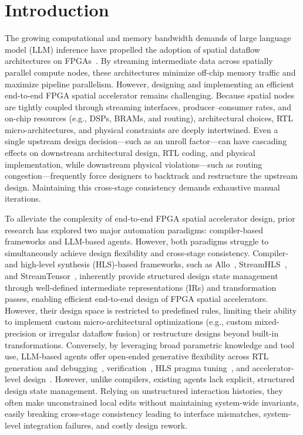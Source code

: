 \documentclass[9pt,conference]{IEEEtran}
\begin{document}
\section{Introduction}
The growing computational and memory bandwidth demands of large language model (LLM) inference have propelled the adoption of spatial dataflow architectures on FPGAs~\cite{streamtensor}. By streaming intermediate data across spatially parallel compute nodes, these architectures minimize off-chip memory traffic and maximize pipeline parallelism. However, designing and implementing an efficient end-to-end FPGA spatial accelerator remains challenging. Because spatial nodes are tightly coupled through streaming interfaces, producer–consumer rates, and on-chip resources (e.g., DSPs, BRAMs, and routing), architectural choices, RTL micro-architectures, and physical constraints are deeply intertwined. Even a single upstream design decision—such as an unroll factor—can have cascading effects on downstream architectural design, RTL coding, and physical implementation, while downstream physical violations—such as routing congestion—frequently force designers to backtrack and restructure the upstream design. Maintaining this cross-stage consistency demands exhaustive manual iterations.

To alleviate the complexity of end-to-end FPGA spatial accelerator design, prior research has explored two major automation paradigms: compiler-based frameworks and LLM-based agents. However, both paradigms struggle to simultaneously achieve design flexibility and cross-stage consistency. Compiler- and high-level synthesis (HLS)-based frameworks, such as Allo~\cite{allo}, StreamHLS~\cite{streamhls}, and StreamTensor~\cite{streamtensor}, inherently provide structured design state management through well-defined intermediate representations (IRs) and transformation passes, enabling efficient end-to-end design of FPGA spatial accelerators. However, their design space is restricted to predefined rules, limiting their ability to implement custom micro-architectural optimizations (e.g., custom mixed-precision or irregular dataflow fusion) or restructure designs beyond built-in transformations. Conversely, by leveraging broad parametric knowledge and tool use, LLM-based agents offer open-ended generative flexibility across RTL generation and debugging~\cite{mage,rtlfixer}, verification~\cite{assertllm,correctbench}, HLS pragma tuning~\cite{hlspilot}, and accelerator-level design~\cite{mahl,gpt4aigchip,designconductor2}. However, unlike compilers, existing agents lack explicit, structured design state management. Relying on unstructured interaction histories, they often make unconstrained local edits without maintaining system-wide invariants, easily breaking cross-stage consistency leading to interface mismatches, system-level integration failures, and costly design rework.
\end{document}
